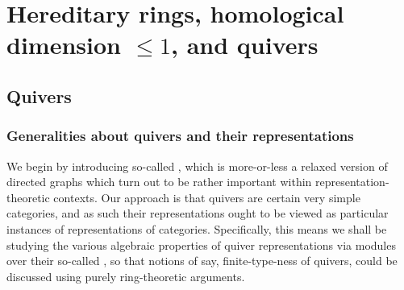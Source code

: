 \section{Hereditary rings, homological dimension \texorpdfstring{$\leq 1$}{}, and quivers}
    \subsection{Quivers}
        \subsubsection{Generalities about quivers and their representations}
            We begin by introducing so-called , which is more-or-less a relaxed version of directed graphs which turn out to be rather important within representation-theoretic contexts. Our approach is that quivers are certain very simple categories, and as such their representations ought to be viewed as particular instances of representations of categories. Specifically, this means we shall be studying the various algebraic properties of quiver representations via modules over their so-called , so that notions of say, finite-type-ness of quivers, could be discussed using purely ring-theoretic arguments.
        
